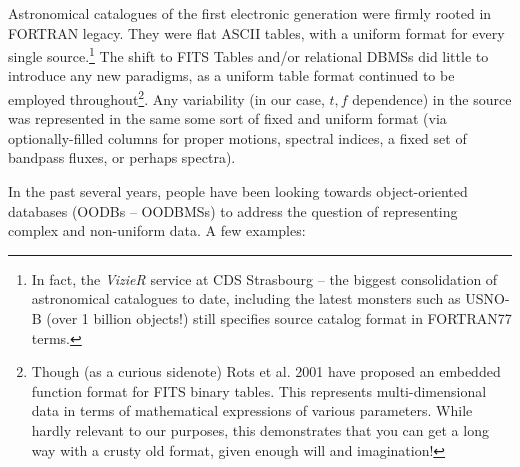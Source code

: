 \documentclass[10pt]{article}
\begin{document}
Astronomical catalogues of the first electronic generation were firmly rooted
in FORTRAN legacy. They were flat ASCII tables, with a uniform format for every
single source.\footnote{In fact, the {\em VizieR} service at CDS Strasbourg
\cite{vizier} -- the biggest consolidation of astronomical catalogues to date,
including the latest monsters such as USNO-B (over 1 billion objects!) still
specifies source catalog format in FORTRAN77 terms.} The shift to FITS Tables and/or
relational DBMSs did little to introduce any new paradigms, as a uniform table
format continued to be employed throughout\footnote{Though  (as a curious
sidenote) Rots et al. 2001 \cite{FEF} have proposed an embedded function format
for FITS binary tables. This represents multi-dimensional data in terms of
mathematical expressions of various parameters. While hardly relevant to our
purposes, this demonstrates that you can get a long way with a crusty old
format, given enough will and imagination!}. 
Any variability (in our case,
$t,f$ dependence) in the source was represented in the same some sort of fixed
and uniform format (via optionally-filled columns for proper motions, spectral
indices, a fixed set of bandpass fluxes, or perhaps spectra).

In the past several years, people have been looking towards object-oriented
databases (OODBs -- OODBMSs) to address the question of representing complex
and non-uniform data. A few examples:
\end{document}
